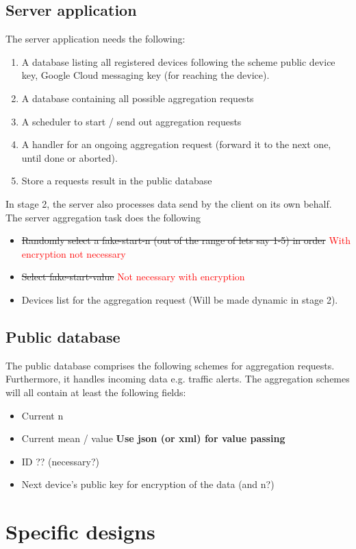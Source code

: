 \subsection{Server application}
The server application needs the following:
\begin{enumerate}
	\item A database listing all registered devices following the scheme {public device key, Google Cloud messaging key (for reaching the device)}.
	\item A database containing all possible aggregation requests
	\item A scheduler to start / send out aggregation requests
	\item A handler for an ongoing aggregation request (forward it to the next one, until done or aborted).
	\item Store a requests result in the public database
\end{enumerate}
In stage 2, the server also processes data send by the client on its own behalf.
The server aggregation task does the following
\begin{itemize}
	\item \sout{Randomly select a fake-start-n (out of the range of lets say 1-5) in order } \textcolor{red}{With encryption not necessary}
	\item \sout{Select fake-start-value} \textcolor{red}{Not necessary with encryption}
	\item Devices list for the aggregation request (Will be made dynamic in stage 2).
\end{itemize}

\subsection{Public database}
The public database comprises the following schemes for aggregation requests.
Furthermore, it handles incoming data e.g. traffic alerts.
The aggregation schemes will all contain at least the following fields:
\begin{itemize}
	\item Current n
	\item Current mean / value \textbf{Use json (or xml) for value passing}
	\item ID ?? (necessary?)
	\item Next device's public key for encryption of the data (and n?)
\end{itemize}

\section{Specific designs}
